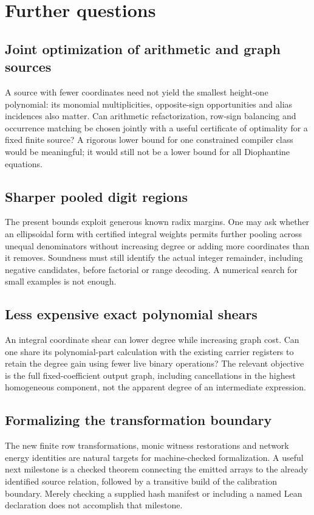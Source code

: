 \section{Further questions}
\subsection{Joint optimization of arithmetic and graph sources}
A source with fewer coordinates need not yield the smallest height-one
polynomial: its monomial multiplicities, opposite-sign opportunities and
alias incidences also matter. Can arithmetic refactorization, row-sign
balancing and occurrence matching be chosen jointly with a useful
certificate of optimality for a fixed finite source? A rigorous lower
bound for one constrained compiler class would be meaningful; it would
still not be a lower bound for all Diophantine equations.

\subsection{Sharper pooled digit regions}
The present bounds exploit generous known radix margins. One may ask
whether an ellipsoidal form with certified integral weights permits further
pooling across unequal denominators without increasing degree or adding
more coordinates than it removes. Soundness must still identify the actual
integer remainder, including negative candidates, before factorial or
range decoding. A numerical search for small examples is not enough.

\subsection{Less expensive exact polynomial shears}
An integral coordinate shear can lower degree while increasing graph cost.
Can one share its polynomial-part calculation with the existing carrier
registers to retain the degree gain using fewer live binary operations?
The relevant objective is the full fixed-coefficient output graph, including
cancellations in the highest homogeneous component, not the apparent degree
of an intermediate expression.

\subsection{Formalizing the transformation boundary}
The new finite row transformations, monic witness restorations and network
energy identities are natural targets for machine-checked formalization.
A useful next milestone is a checked theorem connecting the emitted arrays
to the already identified source relation, followed by a transitive build
of the calibration boundary. Merely checking a supplied hash manifest or
including a named Lean declaration does not accomplish that milestone.
